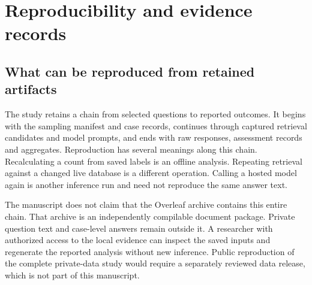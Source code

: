 \section{Reproducibility and evidence records}
\label{app:reproducibility}

\subsection{What can be reproduced from retained artifacts}

The study retains a chain from selected questions to reported outcomes. It begins with the sampling manifest and case records, continues through captured retrieval candidates and model prompts, and ends with raw responses, assessment records and aggregates. Reproduction has several meanings along this chain. Recalculating a count from saved labels is an offline analysis. Repeating retrieval against a changed live database is a different operation. Calling a hosted model again is another inference run and need not reproduce the same answer text.

The manuscript does not claim that the Overleaf archive contains this entire chain. That archive is an independently compilable document package. Private question text and case-level answers remain outside it. A researcher with authorized access to the local evidence can inspect the saved inputs and regenerate the reported analysis without new inference. Public reproduction of the complete private-data study would require a separately reviewed data release, which is not part of this manuscript.


